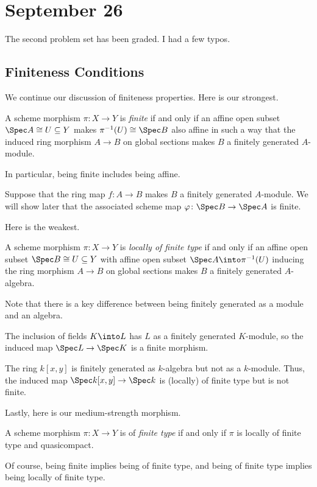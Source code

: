 \documentclass[../notes.tex]{subfiles}
\begin{document}
\section{September 26}

The second problem set has been graded. I had a few typos.

\subsection{Finiteness Conditions}
We continue our discussion of finiteness properties. Here is our strongest.
\begin{definition}[Finite]
	A scheme morphism $\pi\colon X\to Y$ is \textit{finite} if and only if an affine open subset $\Spec A\cong U\subseteq Y$ makes $\pi^{-1}(U)\cong\Spec B$ also affine in such a way that the induced ring morphism $A\to B$ on global sections makes $B$ a finitely generated $A$-module.
\end{definition}
In particular, being finite includes being affine.
\begin{example}
	Suppose that the ring map $f\colon A\to B$ makes $B$ a finitely generated $A$-module. We will show later that the associated scheme map $\varphi\colon\Spec B\to\Spec A$ is finite.
\end{example}
Here is the weakest.
\begin{definition}
	A scheme morphism $\pi\colon X\to Y$ is \textit{locally of finite type} if and only if an affine open subset $\Spec B\cong U\subseteq Y$ with affine open subset $\Spec A\into\pi^{-1}(U)$ inducing the ring morphism $A\to B$ on global sections makes $B$ a finitely generated $A$-algebra.
\end{definition}
Note that there is a key difference between being finitely generated as a module and an algebra.
\begin{example}
	The inclusion of fields $K\into L$ has $L$ as a finitely generated $K$-module, so the induced map $\Spec L\to\Spec K$ is a finite morphism.
\end{example}
\begin{example}
	The ring $k[x,y]$ is finitely generated as $k$-algebra but not as a $k$-module. Thus, the induced map $\Spec k[x,y]\to\Spec k$ is (locally) of finite type but is not finite.
\end{example}
Lastly, here is our medium-strength morphism.
\begin{definition}
	A scheme morphism $\pi\colon X\to Y$ is of \textit{finite type} if and only if $\pi$ is locally of finite type and quasicompact.
\end{definition}
\begin{remark}
	Of course, being finite implies being of finite type, and being of finite type implies being locally of finite type.
\end{remark}
\end{document}
